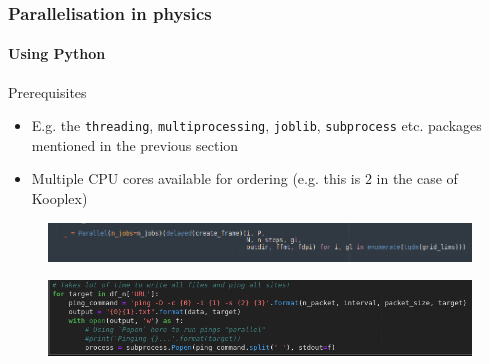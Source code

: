 \begin{frame}
\frametitle{Parallelisation in physics}
\framesubtitle{Using Python}

\begin{exampleblock}{Prerequisites}
	\begin{itemize}
		\item E.g. the \texttt{threading}, \texttt{multiprocessing}, \texttt{joblib}, \texttt{subprocess} etc. packages mentioned in the previous section
		\item Multiple CPU cores available for ordering (e.g. this is $2$ in the case of Kooplex)
	\end{itemize}
\end{exampleblock}

\begin{figure}
	\includegraphics[width=\textwidth]{img/python-joblib.png}
\end{figure}

\begin{figure}
	\includegraphics[width=\textwidth]{img/python-subprocess.png}
\end{figure}

\end{frame}